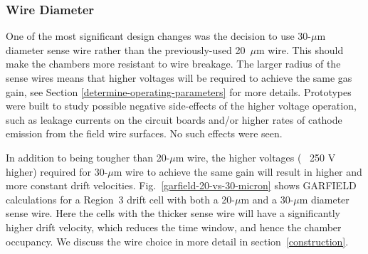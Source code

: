 \subsubsection{Wire Diameter}
One of the most significant design changes was the decision 
to use 30-$\mu$m diameter sense wire rather than the previously-used 
20~$\mu$m wire. 
This should make the chambers more resistant to wire 
breakage.  The larger radius of the sense wires means that higher 
voltages will be required to achieve the same gas gain, see Section \ref{determine-operating-parameters}
for more details.
Prototypes were built to study possible negative side-effects of the 
higher voltage operation, such as leakage currents on the circuit boards 
and/or higher rates of cathode emission from the field wire surfaces.
No such effects were seen.

In addition to being tougher than 20-$\mu$m wire, the higher voltages 
(~ 250 V higher)
required for 30-$\mu$m wire to achieve the same gain will result in
higher and more constant drift velocities.
Fig.~\ref{garfield-20-vs-30-micron} shows GARFIELD calculations for a Region~3 drift cell
with both a 20-$\mu$m and a 30-$\mu$m diameter sense wire.  Here the
cells with the thicker sense wire will have a significantly higher drift 
velocity, which reduces the time window, and hence the 
chamber occupancy.
We discuss the wire choice in more detail in section~\ref{construction}.






 
